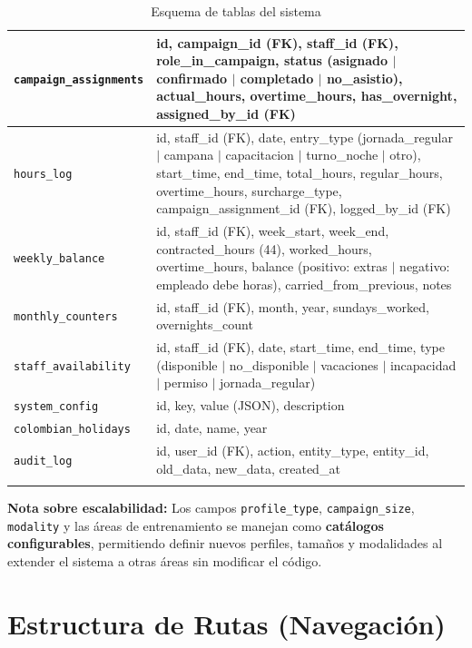 \documentclass[10pt,a4paper]{article}
\begin{document}
\begin{longtable}{|p{4.2cm}|p{10.3cm}|}
\hline
\texttt{campaign\_assignments} & id, campaign\_id (FK), staff\_id (FK), role\_in\_campaign, status (asignado $|$ confirmado $|$ completado $|$ no\_asistio), actual\_hours, overtime\_hours, has\_overnight, assigned\_by\_id (FK) \\
\hline
\texttt{hours\_log} & id, staff\_id (FK), date, entry\_type (jornada\_regular $|$ campana $|$ capacitacion $|$ turno\_noche $|$ otro), start\_time, end\_time, total\_hours, regular\_hours, overtime\_hours, surcharge\_type, campaign\_assignment\_id (FK), logged\_by\_id (FK) \\
\hline
\texttt{weekly\_balance} & id, staff\_id (FK), week\_start, week\_end, contracted\_hours (44), worked\_hours, overtime\_hours, balance (positivo: extras $|$ negativo: empleado debe horas), carried\_from\_previous, notes \\
\hline
\texttt{monthly\_counters} & id, staff\_id (FK), month, year, sundays\_worked, overnights\_count \\
\hline
\texttt{staff\_availability} & id, staff\_id (FK), date, start\_time, end\_time, type (disponible $|$ no\_disponible $|$ vacaciones $|$ incapacidad $|$ permiso $|$ jornada\_regular) \\
\hline
\texttt{system\_config} & id, key, value (JSON), description \\
\hline
\texttt{colombian\_holidays} & id, date, name, year \\
\hline
\texttt{audit\_log} & id, user\_id (FK), action, entity\_type, entity\_id, old\_data, new\_data, created\_at \\
\hline
\caption{Esquema de tablas del sistema}
\end{longtable}

\textbf{Nota sobre escalabilidad:} Los campos \texttt{profile\_type}, \texttt{campaign\_size}, \texttt{modality} y las \'{a}reas de entrenamiento se manejan como \textbf{cat\'{a}logos configurables}, permitiendo definir nuevos perfiles, tamaños y modalidades al extender el sistema a otras \'{a}reas sin modificar el c\'{o}digo.

\section{Estructura de Rutas (Navegaci\'{o}n)}
\end{document}
